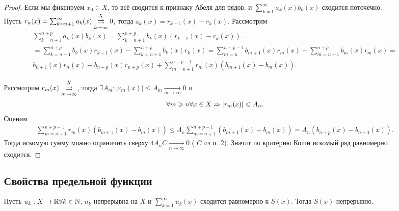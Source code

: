 \documentclass[../main.tex]{subfiles}
\begin{document}
\begin{proof}
  Если мы фиксируем $ x_0 \in X$, то всё сводится к признаку Абеля для рядов, и  $ \sum_{k=1}^{\infty} a_k (x) b_k (x) $ сходится поточечно. \\
  Пусть $ r_n(x) = \sum_{k=n+1}^{\infty} a_k (x) \convergesuniformly{k \to \infty}{X} 0 $, тогда $ a_k (x) = r_{k-1} (x) - r_{k}(x)$. Рассмотрим 
  \begin{multline} 
    \sum_{k=n+1}^{n+p} a_k (x) b_k (x) = \sum_{k=n+1}^{n+p} b_k (x) (r_{k-1}(x) - r_k (x)) =\\= \sum_{k=n+1}^{n+p} b_k(x) r_{k-1}(x) - \sum_{k=n+1}^{n+p} b_k (x) r_k (x) = \sum_{m=n}^{n+p-1} b_{m+1} (x) r_m(x) - \sum_{m=n+1}^{n+p} b_m(x) r_m(x) = \\ b_{n+1} (x) r_n (x) - b_{n+p}(x)r_{n+p}(x) + \sum_{m=n+1}^{n+p-1} r_m(x)(b_{m+1}(x) - b_m(x))     .
  \end{multline} 

  Рассмотрим $ r_m(x) \convergesuniformly{m \to \infty}{X}$, тогда $ \exists A_m : \left| r_m(x) \right| \leq A_m  \xrightarrow[m \to  \infty ]{} 0 $ и 
  \begin{gather} 
    \forall m \geq n \forall x \in X \hence \left| r_m(x) \right| \leq A_n.
  \end{gather}  
  Оценим
  \begin{gather} 
    \sum_{m=n+1}^{n+p-1} r_m(x)(b_{m+1}(x) - b_m(x)) \leq A_n \sum_{m=n+1}^{n+p-1} (b_{m+1}(x) - b_m(x)) =  A_n (b_{n+p}(x) - b_{n+1}(x)).
  \end{gather}
  Тогда искомую сумму можно ограничить сверху $ 4A_n C  \xrightarrow[n \to  \infty ]{} 0 $ ( $ C$ из п. 2). Значит по критерию Коши искомый ряд равномерно сходится.
\end{proof}

\subsection{Свойства предельной функции}


\begin{proposition}
  Пусть $ u_k : X \to \R \forall k \in \N$, $ u_k$ непрерывна на $ X$ и $ \sum_{k=1}^{\infty} u_k(x) $ сходится равномерно к $ S(x)$. Тогда $ S(x)$ непрерывно.     
\end{proposition}
\end{document}
